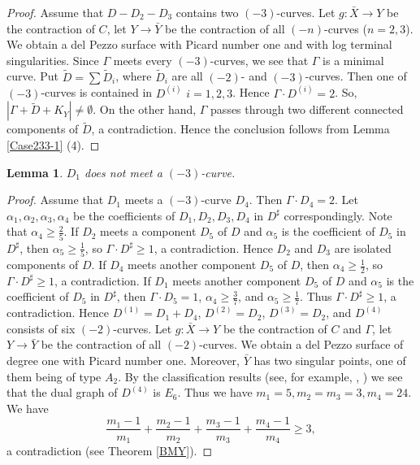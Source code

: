 \documentclass[10pt,oneside,reqno]{amsart}
\newtheorem{lemma}[theorem]{Lemma}
\theoremstyle{definition}
\theoremstyle{remark}
\numberwithin{equation}{section}
\begin{document}
\begin{proof}
Assume that $D-D_2-D_3$ contains two $(-3)$-curves. Let $g\colon\bar{X}\rightarrow Y$ be the contraction of $C$, let $Y\rightarrow\bar{Y}$ be the contraction of all $(-n)$-curves ($n=2,3$). We obtain a del Pezzo surface with Picard number one and with log terminal singularities. Since $\Gamma$ meets every $(-3)$-curves, we see that $\Gamma$ is a minimal curve. Put $\tilde{D}=\sum\tilde{D}_i$, where $\tilde{D}_i$ are all $(-2)$- and $(-3)$-curves. Then one of $(-3)$-curves is contained in $D^{(i)}$ $i=1,2,3$. Hence $\Gamma\cdot  D^{(i)}=2$. So, $|\Gamma+\tilde{D}+K_Y|\neq\emptyset$. On the other hand, $\Gamma$ passes through two different connected components of $\tilde{D}$, a contradiction. Hence the conclusion follows from Lemma  \ref{Case233-1} (4).
\end{proof}


\begin{lemma}
\label{Case233-5}
$D_1$ does not meet a $(-3)$-curve.
\end{lemma}

\begin{proof}
Assume that $D_1$ meets a $(-3)$-curve $D_4$. Then $\Gamma\cdot D_4=2$. Let $\alpha_1,\alpha_2,\alpha_3,\alpha_4$ be the coefficients of $D_1, D_2, D_3, D_4$ in $D^{\sharp}$ correspondingly. Note that $\alpha_4\geq\frac{2}{5}$. If $D_2$ meets a component $D_5$ of $D$ and $\alpha_5$ is the coefficient of $D_5$ in $D^{\sharp}$, then $\alpha_5\geq\frac{1}{5}$, so $\Gamma\cdot D^{\sharp}\geq 1$, a contradiction. Hence $D_2$ and $D_3$ are isolated components of $D$. If  $D_4$ meets another component $D_5$ of $D$, then $\alpha_4\geq\frac{1}{2}$, so $\Gamma\cdot D^{\sharp}\geq 1$, a contradiction. If $D_1$ meets another component $D_5$ of $D$ and $\alpha_5$ is the coefficient of $D_5$ in $D^{\sharp}$, then $\Gamma\cdot D_5=1$, $\alpha_4\geq\frac{3}{7}$, and $\alpha_5\geq\frac{1}{7}$. Thus $\Gamma\cdot D^{\sharp}\geq 1$, a contradiction. Hence $D^{(1)}=D_1+D_4$, $D^{(2)}=D_2$, $D^{(3)}=D_2$, and $D^{(4)}$ consists of six $(-2)$-curves. Let $g\colon\bar{X}\rightarrow Y$ be the contraction of $C$ and $\Gamma$, let $Y\rightarrow\bar{Y}$ be the contraction of all $(-2)$-curves. We obtain a del Pezzo surface of degree one  with Picard number one. Moreover, $\bar{Y}$ has two singular points,  one of them being of type $A_2$. By the classification results (see, for example, {\cite{AN}}, {\cite{Fur}}) we see that the dual graph of $D^{(4)}$ is $E_6$. Thus we have $m_1=5, m_2=m_3=3, m_4=24$. We have \[\frac{m_1-1}{m_1}+\frac{m_2-1}{m_2}+\frac{m_3-1}{m_3}+\frac{m_4-1}{m_4}\geq 3,\] a contradiction (see Theorem \ref{BMY}).
\end{proof}
\end{document}
